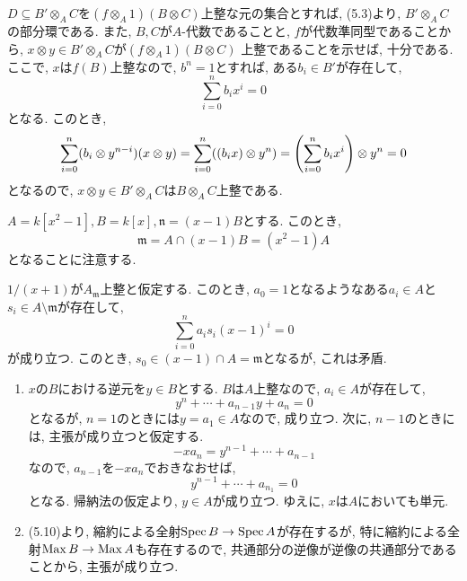 \documentclass[dvipdfmx]{jsarticle}
\begin{document}
    \begin{problem}
        $D \subseteq B' \otimes_A C$を$(f\otimes_A 1)(B \otimes C)$上整な元の集合とすれば,
        (5.3)より, $B'\otimes_A C$の部分環である.
        また, $B, C$が$A$-代数であることと, $f$が代数準同型であることから,
        $x \otimes y \in B'\otimes_A C$が$(f\otimes_A 1)(B \otimes C)$
        上整であることを示せば, 十分である.
        ここで, $x$は$f(B)$上整なので, $b^n = 1$とすれば, ある$b_i \in B'$が存在して,
        \[
            \sum_{i = 0}^n b_ix^i = 0
        \]
        となる.
        このとき,
        \[
            \sum_{i = 0}^n (b_i \otimes y^{n-i})(x\otimes y) = \sum_{i=0}^n ((b_ix)\otimes y^n) = \qty(\sum_{i = 0}^n b_ix^i)\otimes y^n = 0
        \]
        となるので, $x\otimes y \in B'\otimes_A C$は$B\otimes_A C$上整である.
    \end{problem}

    \begin{problem}
        $A = k[x^2-1], B = k[x], \mathfrak{n} = (x-1)B$とする.
        このとき,
        \[
           \mathfrak{m} =  A \cap (x-1)B = (x^2-1)A
        \]
        となることに注意する.

        $1/(x+1)$が$A_{\mathfrak{m}}$上整と仮定する.
        このとき, $a_0 = 1$となるようなある$a_i \in A$と$s_i \in A \setminus \mathfrak{m}$が存在して,
        \[
            \sum_{i = 0}^n a_is_i(x-1)^i = 0
        \]
        が成り立つ.
        このとき, $s_0 \in (x-1) \cap A = \mathfrak{m}$となるが, これは矛盾.
    \end{problem}

    \begin{problem}
        \begin{enumerate}
            \item  $x$の$B$における逆元を$y \in B$とする.
            $B$は$A$上整なので, $a_i \in A$が存在して,
            \[
                y^n + \cdots + a_{n-1}y + a_n = 0
            \]
            となるが, $n = 1$のときには$y = a_1 \in A$なので, 成り立つ.
            次に, $n-1$のときには, 主張が成り立つと仮定する.
            \[
                -xa_n = y^{n-1} + \cdots + a_{n-1}
            \]
            なので, $a_{n-1}$を$-xa_n$でおきなおせば,
            \[
                y^{n-1} + \cdots + a_{n_1} = 0
            \]
            となる.
            帰納法の仮定より, $y \in A$が成り立つ.
            ゆえに, $x$は$A$においても単元.
            \item (5.10)より, 縮約による全射$\operatorname{Spec}{B} \to \operatorname{Spec}{A}$が存在するが,
            特に縮約による全射$\operatorname{Max}{B} \to \operatorname{Max}{A}$も存在するので, 共通部分の逆像が逆像の共通部分であることから, 主張が成り立つ.
        \end{enumerate}
    \end{problem}
\end{document}
